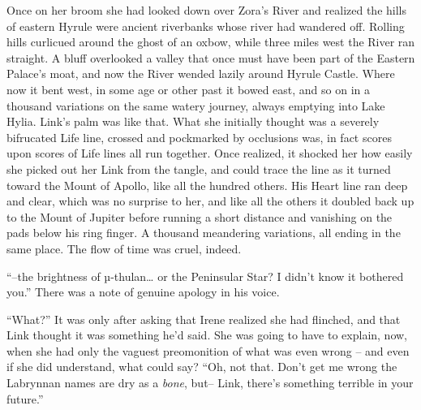 \documentclass[../FGP.tex]{subfiles}
\begin{document}
\begin{fragment}
Once on her broom she had looked down over Zora's River and realized the hills of eastern Hyrule were ancient riverbanks whose river had wandered off.%
    \normalmarginpar{}
Rolling hills curlicued around the ghost of an oxbow, while three miles west the River ran straight. A bluff overlooked a valley that once must have been part of the Eastern Palace's moat, and now the River wended lazily around Hyrule Castle. Where now it bent west, in some age or other past it bowed east, and so on in a thousand variations on the same watery journey, always emptying into Lake Hylia. Link's palm was like that. What she initially thought was a severely bifrucated Life line, crossed and pockmarked by occlusions was, in  fact scores upon scores of Life lines all run together. Once realized, it shocked her how easily she picked out her Link%
    \reversemarginpar{}
from the tangle, and could trace the line as it turned toward the Mount of Apollo, like all the hundred others. His Heart line ran deep and clear, which was no surprise to her, and like all the others it doubled back up to the Mount of Jupiter before running a short distance and vanishing on the pads below his ring finger. A thousand meandering variations, all ending in the same place. The flow of time was cruel, indeed.

\normalmarginpar``--the brightness of {\Gr µ}-thulan\ldots{} or the Peninsular Star? I didn't know it bothered you.'' There was a note of genuine apology in his voice.

``What?'' It was only after asking that Irene realized she had flinched, and that Link thought it was something he'd said. She was going to have to explain, now, when she had only the vaguest preomonition of what was even wrong -- and even if she did understand, what could say? ``Oh, not that. Don't get me wrong the Labrynnan names are dry as a \emph{bone}, but-- Link, there's something terrible in your future.''  


\end{fragment}
\end{document}
